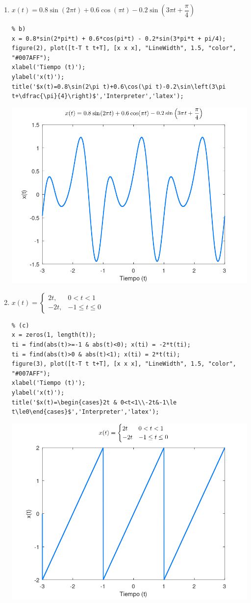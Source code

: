\documentclass{article}
\begin{document}
\begin{enumerate}[leftmargin=*]
\begin{enumerate}[label=\alph*)]
\item $x(t)=0.8\sin(2\pi t)+0.6\cos(\pi t)-0.2\sin\left(3\pi t+\dfrac{\pi}{4}\right)$
\begin{lstlisting}
% b)
x = 0.8*sin(2*pi*t) + 0.6*cos(pi*t) - 0.2*sin(3*pi*t + pi/4);
figure(2), plot([t-T t t+T], [x x x], "LineWidth", 1.5, "color", "#007AFF");
xlabel('Tiempo (t)');
ylabel('x(t)');
title('$x(t)=0.8\sin(2\pi t)+0.6\cos(\pi t)-0.2\sin\left(3\pi t+\dfrac{\pi}{4}\right)$','Interpreter','latex');
\end{lstlisting}
\begin{center}
\includegraphics[width=0.5\linewidth]{Imágenes/Figura2}
\end{center}
\item $x(t)=\begin{cases}
2t, & 0<t<1\\
-2t,&-1\le t\le0
\end{cases}$
\begin{lstlisting}
% (c)
x = zeros(1, length(t));
ti = find(abs(t)>=-1 & abs(t)<0); x(ti) = -2*t(ti);
ti = find(abs(t)>0 & abs(t)<1); x(ti) = 2*t(ti);
figure(3), plot([t-T t t+T], [x x x], "LineWidth", 1.5, "color", "#007AFF");
xlabel('Tiempo (t)');
ylabel('x(t)');
title('$x(t)=\begin{cases}2t & 0<t<1\\-2t&-1\le t\le0\end{cases}$','Interpreter','latex');
\end{lstlisting}
\begin{center}
\includegraphics[width=0.5\linewidth]{Imágenes/Figura3}

\end{center}
\end{enumerate}
\end{enumerate}
\end{document}
